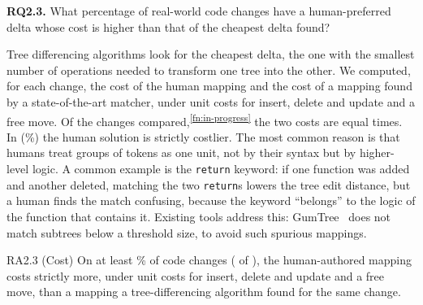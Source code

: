 \documentclass[sigconf,review]{acmart}
\begin{document}
\textbf{RQ2.3.} What percentage of real-world code changes have a human-preferred delta whose
cost is higher than that of the cheapest delta found?

Tree differencing algorithms look for the cheapest delta, the one with the smallest number of
operations needed to transform one tree into the other. We computed, for each change, the cost of
the human mapping and the cost of a mapping found by a state-of-the-art matcher, under unit costs
for insert, delete and update and a free move. Of the \CostScored{} changes
compared,\textsuperscript{\ref{fn:in-progress}} the two costs are equal \CostTieFixtures{} times.
In \CostHumanHigherFixtures{} (\CostHumanHigherPct{}\%) the human solution is strictly costlier.
The most common reason is that humans treat groups of tokens as one unit, not by their syntax but
by higher-level logic. A common example is the \texttt{return} keyword: if one function was added
and another deleted, matching the two \texttt{return}s lowers the tree edit distance, but a human
finds the match confusing, because the keyword ``belongs'' to the logic of the function that contains
it. Existing tools address this: GumTree~\cite{gumtreediff-2014} does not match subtrees
below a threshold size, to avoid such spurious mappings.

\begin{resultbox}{RA2.3 (Cost)}
  On at least \CostHumanHigherPct{}\% of code changes (\CostHumanHigherFixtures{} of
  \CostScored{}), the human-authored mapping costs strictly more, under unit costs for insert,
  delete and update and a free move, than a mapping a tree-differencing algorithm found for the
  same change.
\end{resultbox}
\end{document}

